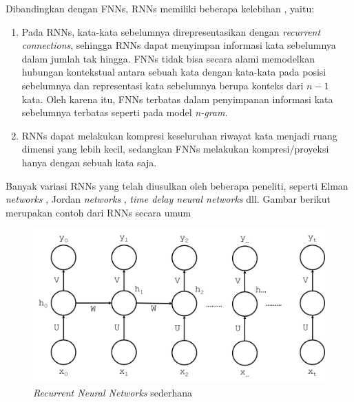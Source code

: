 Dibandingkan dengan FNNs, RNNs memiliki beberapa kelebihan \citep{mikolov2010recurrent}, yaitu:
\begin{enumerate}
	\item Pada RNNs, kata-kata sebelumnya direpresentasikan dengan \textit{recurrent connections}, sehingga RNNs dapat menyimpan informasi kata sebelumnya dalam jumlah tak hingga. FNNs tidak bisa secara alami memodelkan hubungan kontekstual antara sebuah kata dengan kata-kata pada posisi sebelumnya dan representasi kata sebelumnya berupa konteks dari $ n-1 $ kata. Oleh karena itu, FNNs terbatas dalam penyimpanan informasi kata sebelumnya terbatas seperti pada model \textit{n-gram}.
	\item RNNs dapat melakukan kompresi keseluruhan riwayat kata menjadi ruang dimensi yang lebih kecil, sedangkan FNNs melakukan kompresi/proyeksi hanya dengan sebuah kata saja.
\end{enumerate}

Banyak variasi RNNs yang telah diusulkan oleh beberapa peneliti, seperti Elman \textit{networks} \citep{elman1990finding}, Jordan \textit{networks} \citep{jordan1986attractor}, \textit{time delay neural networks} \citep{lang1990time} dll. Gambar berikut merupakan contoh  dari RNNs secara umum

\begin{figure}
	\centering
	\includegraphics[width=0.80\linewidth]{images/simple_rnn}
	\caption{\textit{Recurrent Neural Networks} sederhana}
	\label{fig:simple_rnn}
\end{figure}

